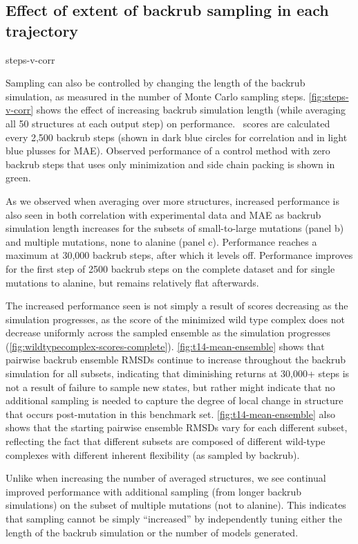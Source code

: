 \subsection{Effect of extent of backrub sampling in each trajectory}

{steps-v-corr}

Sampling can also be controlled by changing the length of the backrub simulation, as measured in the number of Monte Carlo sampling steps.
\cref{fig:steps-v-corr} shows the effect of increasing backrub simulation length (while averaging all 50 structures at each output step) on performance.
\ddg\ scores are calculated every 2,500 backrub steps (shown in dark blue circles for correlation and in light blue plusses for MAE).
Observed performance of a control method with zero backrub steps that uses only minimization and side chain packing is shown in green.

As we observed when averaging over more structures, increased performance is also seen in both correlation with experimental data and MAE as backrub simulation length increases for the subsets of small-to-large mutations (panel b) and multiple mutations, none to alanine (panel c).
Performance reaches a maximum at 30,000 backrub steps, after which it levels off.
Performance improves for the first step of 2500 backrub steps on the complete dataset and for single mutations to alanine, but remains relatively flat afterwards.

The increased performance seen is not simply a result of scores decreasing as the simulation progresses, as the score of the minimized wild type complex does not decrease uniformly across the sampled ensemble as the simulation progresses (\cref{fig:wildtypecomplex-scores-complete}).
\cref{fig:t14-mean-ensemble} shows that pairwise backrub ensemble RMSDs continue to increase throughout the backrub simulation for all subsets, indicating that diminishing returns at 30,000+ steps is not a result of failure to sample new states, but rather might indicate that no additional sampling is needed to capture the degree of local change in structure that occurs post-mutation in this benchmark set.
\cref{fig:t14-mean-ensemble} also shows that the starting pairwise ensemble RMSDs vary for each different subset, reflecting the fact that different subsets are composed of different wild-type complexes with different inherent flexibility (as sampled by backrub).

Unlike when increasing the number of averaged structures, we see continual improved performance with additional sampling (from longer backrub simulations) on the subset of multiple mutations (not to alanine).
This indicates that sampling cannot be simply ``increased'' by independently tuning either the length of the backrub simulation or the number of models generated. %


